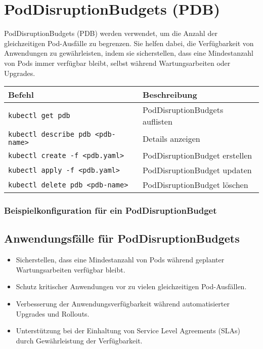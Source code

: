 \section{PodDisruptionBudgets (PDB)}
PodDisruptionBudgets (PDB) werden verwendet, um die Anzahl der gleichzeitigen Pod-Ausfälle zu begrenzen. Sie helfen dabei, die Verfügbarkeit von Anwendungen zu gewährleisten, indem sie sicherstellen, dass eine Mindestanzahl von Pods immer verfügbar bleibt, selbst während Wartungsarbeiten oder Upgrades.\\

\noindent
\begin{tabular}{
|p{}|p{}|}
\hline
\textbf{Befehl} & \textbf{Beschreibung} \\
\hline
\texttt{kubectl get pdb} & PodDisruptionBudgets auflisten \\
\texttt{kubectl describe pdb <pdb-name>} & Details anzeigen \\
\texttt{kubectl create -f <pdb.yaml>} & PodDisruptionBudget erstellen\\
\texttt{kubectl apply -f <pdb.yaml>} & PodDisruptionBudget updaten\\
\texttt{kubectl delete pdb <pdb-name>} & PodDisruptionBudget löschen \\
\hline
\end{tabular}

\subsubsection{Beispielkonfiguration für ein PodDisruptionBudget}


\newpage

\subsection{Anwendungsfälle für PodDisruptionBudgets}
\begin{itemize}
    \item Sicherstellen, dass eine Mindestanzahl von Pods während geplanter Wartungsarbeiten verfügbar bleibt.
    \item Schutz kritischer Anwendungen vor zu vielen gleichzeitigen Pod-Ausfällen.
    \item Verbesserung der Anwendungsverfügbarkeit während automatisierter Upgrades und Rollouts.
    \item Unterstützung bei der Einhaltung von Service Level Agreements (SLAs) durch Gewährleistung der Verfügbarkeit.
\end{itemize}


